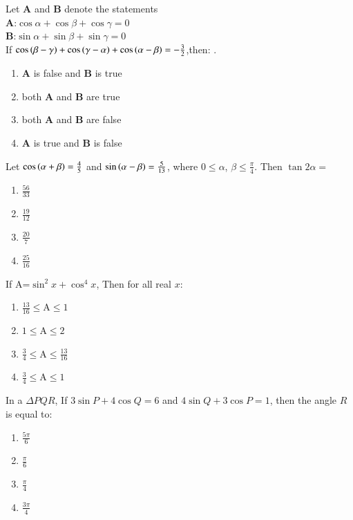 \item Let \textbf{A} and \textbf{B} denote the statements
\\ \textbf{A}:$\cos\alpha+\cos\beta+\cos\gamma=0$
\\ \textbf{B}:$\sin\alpha+\sin\beta+\sin\gamma=0$
\\If $\cos\left(\beta-\gamma\right)+\cos\left(\gamma-\alpha\right)+\cos\left(\alpha-\beta\right)=-\frac{3}{2}$,then:
.\hfill{}
\begin{enumerate}
\item \textbf{A} is false and \textbf{B} is true 
\item both \textbf{A} and \textbf{B} are true
\item both \textbf{A} and \textbf{B} are false 
\item \textbf{A} is true and \textbf{B} is false
\end{enumerate}
\item Let $\cos\left(\alpha+\beta\right)=\frac{4}{5}$  and $\sin\left(\alpha-\beta\right)=\frac{5}{13}$, where $0\le\alpha$, $\beta\le\frac{\pi}{4}$. Then $\tan2\alpha=$ \hfill{}
\begin{multicols}{4}
\begin{enumerate}
\item $\frac{56}{33}$
\columnbreak
\item $\frac{19}{12}$
\columnbreak
\item $\frac{20}{7}$
\columnbreak
\item $\frac{25}{16}$
\end{enumerate} 
\end{multicols}
\item If A=$\sin^2x +\cos^4 x$, Then for all real $x$:
\hfill{}
\begin{multicols}{2} 
\begin{enumerate}
\item $\frac{13}{16}\le$A$\le1$
\item $1\le$A$\le2$
\columnbreak
\item $\frac{3}{4}\le$A$\le\frac{13}{16}$
\item $\frac{3}{4}\le$A$\le1$
\end{enumerate} 
\end{multicols}
\item In a ${\Delta PQR}$, If $3 \sin {P} + 4 \cos {Q}=6$ and $4\sin {Q}+3\cos {P}=1$, then the angle ${R}$ is equal to:
\hfill{}
\begin{multicols}{4}
\begin{enumerate}
\item $\frac{5\pi}{6}$
\columnbreak
\item $\frac{\pi}{6}$
\columnbreak
\item $\frac{\pi}{4}$
\columnbreak
\item $\frac{3\pi}{4}$
\end{enumerate} 
\end{multicols}
